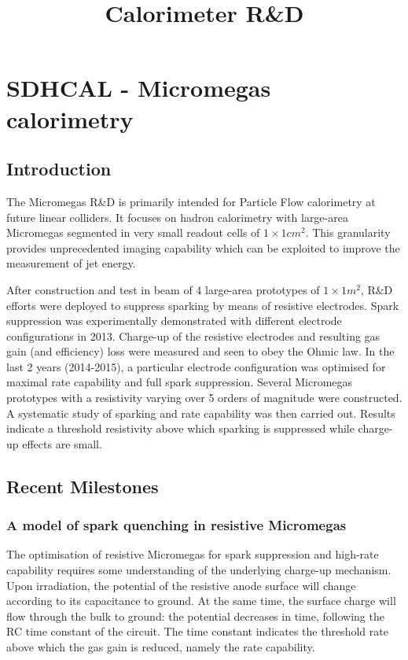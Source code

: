 \documentclass{article}
\title{Calorimeter R\&D}
\begin{document}
\maketitle

\section{SDHCAL - Micromegas calorimetry}
\subsection{Introduction}
The Micromegas R\&D is primarily intended for Particle Flow calorimetry at future linear colliders. It focuses on hadron calorimetry with large-area Micromegas segmented in very small readout cells of $1\times\unit{1}{cm^{2}}$. This granularity provides unprecedented imaging capability which can be exploited to improve the measurement of jet energy.

After construction and test in beam of 4 large-area prototypes of $1\times\unit{1}{m^{2}}$, R\&D efforts were deployed to suppress sparking by means of resistive electrodes. Spark suppression was experimentally demonstrated with different electrode configurations in 2013. Charge-up of the resistive electrodes and resulting gas gain (and efficiency) loss were measured and seen to obey the Ohmic law. In the last 2 years (2014-2015), a particular electrode configuration was optimised for maximal rate capability and full spark suppression. Several Micromegas prototypes with a resistivity varying over 5 orders of magnitude were constructed. A systematic study of sparking and rate capability was then carried out. Results indicate a threshold resistivity above which sparking is suppressed while charge-up effects are small.



\subsection{Recent Milestones}

\subsubsection{A model of spark quenching in resistive Micromegas}
\label{quench_model}

The optimisation of resistive Micromegas for spark suppression and high-rate capability requires some understanding of the underlying charge-up mechanism. Upon irradiation, the potential of the resistive anode surface will change according to its capacitance to ground. At the same time, the surface charge will flow through the bulk to ground: the potential decreases in time, following the RC time constant of the circuit. The time constant indicates the threshold rate above which the gas gain is reduced, namely the rate capability.
\end{document}
